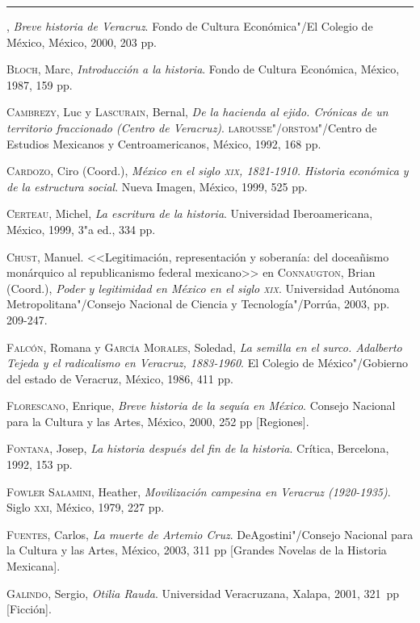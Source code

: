 \documentclass[14pt,twoside,final]{extbook} %
\begin{document}
\rule{1cm}{0.4pt}, \emph{Breve historia de Veracruz}. Fondo de Cultura Económica"/El Colegio de México, México, 2000, 203 pp.

\textsc{Bloch}, Marc, \emph{Introducción a la historia}. Fondo de Cultura Económica, México, 1987, 159 pp.

\textsc{Cambrezy}, Luc y \textsc{Lascurain}, Bernal, \emph{De la hacienda al ejido. Crónicas de un territorio fraccionado (Centro de Veracruz)}. \textsc{larousse"/orstom}"/Centro de Estudios Mexicanos y Centroamericanos, México, 1992, 168 pp.

\textsc{Cardozo}, Ciro (Coord.), \emph{México en el siglo \textsc{xix}, 1821-1910. Historia económica y de la estructura social}. Nueva Imagen, México, 1999, 525 pp.

\textsc{Certeau}, Michel, \emph{La escritura de la historia}. Universidad Iberoamericana, México, 1999, 3"a ed., 334 pp.

\textsc{Chust}, Manuel. <<Legitimación, representación y soberanía: del doceañismo
monárquico al republicanismo federal mexicano>> en \textsc{Connaugton}, Brian (Coord.), \emph{Poder y legitimidad en México en el siglo \textsc{xix}}. Universidad Autónoma Metropolitana"/Consejo Nacional de Ciencia y Tecnología"/Porrúa, 2003, pp. 209-247.

\textsc{Falcón}, Romana y \textsc{García Morales}, Soledad, \emph{La semilla en el surco. Adalberto Tejeda y el radicalismo en Veracruz, 1883-1960}. El Colegio de México"/Gobierno del
estado de Veracruz, México, 1986, 411 pp.

\textsc{Florescano}, Enrique, \emph{Breve historia de la sequía en México}. Consejo Nacional para la Cultura y las Artes, México, 2000, 252 pp [Regiones].

\textsc{Fontana}, Josep, \emph{La historia después del fin de la historia}. Crítica, Bercelona, 1992, 153 pp.

\textsc{Fowler Salamini}, Heather, \emph{Movilización campesina en Veracruz (1920-1935)}. Siglo \textsc{xxi}, México, 1979, 227 pp.

\textsc{Fuentes}, Carlos, \emph{La muerte de Artemio Cruz}. DeAgostini"/Consejo Nacional para la Cultura y las Artes, México, 2003, 311 pp [Grandes Novelas de la Historia Mexicana].

\textsc{Galindo}, Sergio, \emph{Otilia Rauda}. Universidad Veracruzana, Xalapa, 2001, 321~pp [Ficción].
\end{document}
